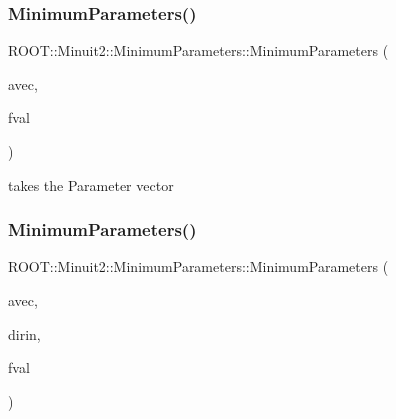 \mbox{\label{classROOT_1_1Minuit2_1_1MinimumParameters_a72fd528946a07bcf3e320c0505953aa8}} 
\subsubsection{\texorpdfstring{MinimumParameters()}{MinimumParameters()}\hspace{0.1cm}{\footnotesize\ttfamily [6/8]}}
{\footnotesize\ttfamily R\+O\+O\+T\+::\+Minuit2\+::\+Minimum\+Parameters\+::\+Minimum\+Parameters (\begin{DoxyParamCaption}\item[{const \mbox{\hyperlink{namespaceROOT_1_1Minuit2_a62ed97730a1ca8d3fbaec64a19aa11c9}{Mn\+Algebraic\+Vector}} \&}]{avec,  }\item[{double}]{fval }\end{DoxyParamCaption})\hspace{0.3cm}{\ttfamily [inline]}}

takes the Parameter vector \mbox{\label{classROOT_1_1Minuit2_1_1MinimumParameters_ad771c737e802f1f6a6f01b94dd249ef7}} 
\subsubsection{\texorpdfstring{MinimumParameters()}{MinimumParameters()}\hspace{0.1cm}{\footnotesize\ttfamily [7/8]}}
{\footnotesize\ttfamily R\+O\+O\+T\+::\+Minuit2\+::\+Minimum\+Parameters\+::\+Minimum\+Parameters (\begin{DoxyParamCaption}\item[{const \mbox{\hyperlink{namespaceROOT_1_1Minuit2_a62ed97730a1ca8d3fbaec64a19aa11c9}{Mn\+Algebraic\+Vector}} \&}]{avec,  }\item[{const \mbox{\hyperlink{namespaceROOT_1_1Minuit2_a62ed97730a1ca8d3fbaec64a19aa11c9}{Mn\+Algebraic\+Vector}} \&}]{dirin,  }\item[{double}]{fval }\end{DoxyParamCaption})\hspace{0.3cm}{\ttfamily [inline]}}


